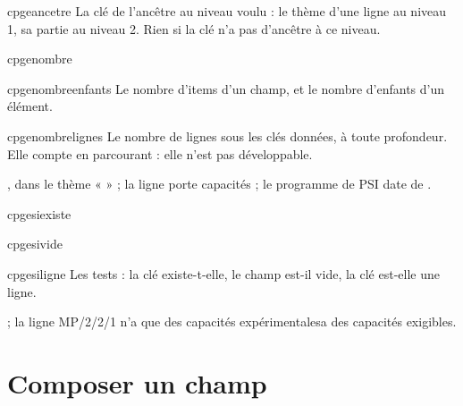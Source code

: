 \documentclass[a4paper,11pt]{article}
\begin{document}
\begin{docCommand}{cpgeancetre}{}
  La clé de l'ancêtre au niveau voulu : le thème d'une ligne au niveau 1, sa
  partie au niveau 2. Rien si la clé n'a pas d'ancêtre à ce niveau.
\end{docCommand}

\begin{docCommand}{cpgenombre}{}\end{docCommand}
\begin{docCommand}{cpgenombreenfants}{}
  Le nombre d'items d'un champ, et le nombre d'enfants d'un élément.
\end{docCommand}
\begin{docCommand}{cpgenombrelignes}{}
  Le nombre de lignes sous les clés données, à toute profondeur. Elle compte en
  parcourant : elle n'est pas développable.
\end{docCommand}

\begin{dispExample}
, dans le thème
«  » ;
la ligne  porte
 capacités ;
le programme de PSI date de .
\end{dispExample}

\begin{docCommand}{cpgesiexiste}{}\end{docCommand}
\begin{docCommand}{cpgesivide}{}\end{docCommand}
\begin{docCommand}{cpgesiligne}{}
  Les tests : la clé existe-t-elle, le champ est-il vide, la clé est-elle une
  ligne.
\end{docCommand}

\begin{dispExample}
 ;
la ligne MP/2/2/1 %
  {n'a que des capacités expérimentales}{a des capacités exigibles}.
\end{dispExample}

\section{Composer un champ}
\end{document}
